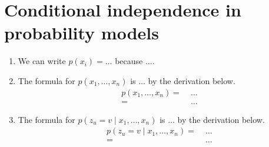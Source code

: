 \section{Conditional independence in probability models}

\begin{enumerate} 
\item We can write $p(x_i) = \ldots$ because $\ldots$.

\item The formula for $p(x_1, \dots, x_n)$ is $\ldots$ by the
  derivation below.
  \begin{align*}
    p(x_1, \dots, x_n) =&\; \ldots \\
    =&\; \ldots
  \end{align*}

\item The formula for $p(z_u = v \mid x_1, \dots, x_n)$ is $\ldots$ by
  the derivation below.
  \begin{align*}
    p(z_u = v \mid x_1, \dots, x_n) =&\; \ldots \\
    =&\; \ldots
  \end{align*}
\end{enumerate}
